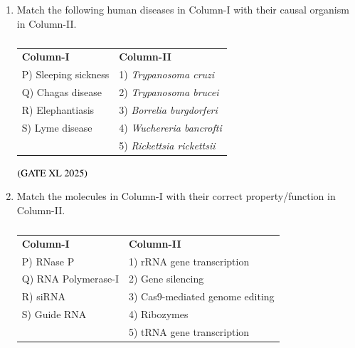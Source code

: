 \documentclass[journal]{IEEEtran}
\begin{document}
\begin{enumerate}
    \item Match the following human diseases in Column-I with their causal organism in Column-II.

    \begin{table}[H]
        \centering
        \begin{tabular}{ll}
            \textbf{Column-I} & \textbf{Column-II} \\
            P) Sleeping sickness & 1) \textit{Trypanosoma cruzi} \\
            Q) Chagas disease    & 2) \textit{Trypanosoma brucei} \\
            R) Elephantiasis     & 3) \textit{Borrelia burgdorferi} \\
            S) Lyme disease      & 4) \textit{Wuchereria bancrofti} \\
                                 & 5) \textit{Rickettsia rickettsii} \\
        \end{tabular}
        \caption*{}
        \label{tab:xl2025_q94}
    \end{table}

    \hfill $\left(\text{GATE XL 2025}\right)$
    \begin{enumerate}
    \end{enumerate}

    \item Match the molecules in Column-I with their correct property/function in Column-II.

    \begin{table}[H]
        \centering
        \begin{tabular}{ll}
            \textbf{Column-I} & \textbf{Column-II} \\
            P) RNase P        & 1) rRNA gene transcription \\
            Q) RNA Polymerase-I & 2) Gene silencing \\
            R) siRNA          & 3) Cas9-mediated genome editing \\
            S) Guide RNA      & 4) Ribozymes \\
                              & 5) tRNA gene transcription \\
        \end{tabular}
        \caption*{}
        \label{tab:xl2025_q95}
    \end{table}


\end{enumerate}
\end{document}
